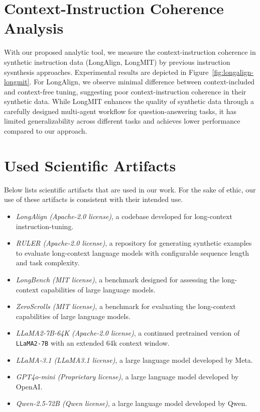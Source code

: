 \section{Context-Instruction Coherence Analysis}
\label{sec:longalign-longmit-context-free-tuning}
With our proposed analytic tool, we measure the context-instruction coherence in synthetic instruction data (LongAlign, LongMIT) by previous instruction sysnthesis approaches.
Experimental results are depicted in Figure~\ref{fig:longalign-longmit}.
For LongAlign, we observe minimal difference between context-included and context-free tuning, suggesting poor context-instruction coherence in their synthetic data.
While LongMIT enhances the quality of synthetic data through a carefully designed multi-agent workflow for question-answering tasks, it has limited generalizability across different tasks and achieves lower performance compared to our approach.

\section{Used Scientific Artifacts}
Below lists scientific artifacts that are used in our work. For the sake of ethic, our use of these artifacts is consistent with their intended use.
\begin{itemize} [itemsep=1pt]
    \item \textit{LongAlign (Apache-2.0 license)}, a codebase developed for long-context instruction-tuning. 
    \item \textit{RULER (Apache-2.0 license)}, a repository for generating synthetic examples to evaluate long-context language models with configurable sequence length and task complexity. 
    \item \textit{LongBench (MIT license)}, a benchmark designed for assessing the long-context capabilities of large language models.
    \item \textit{ZeroScrolls (MIT license)}, a benchmark for evaluating the long-context capabilities of large language models.
    \item \textit{LLaMA2-7B-64K (Apache-2.0 license)}, a continued pretrained version of \texttt{LLaMA2-7B} with an extended 64k context window.
    \item \textit{LLaMA-3.1 (LLaMA3.1 license)}, a large language model developed by Meta. 
    \item \textit{GPT4o-mini (Proprietary license)}, a large language model developed by OpenAI.
    \item \textit{Qwen-2.5-72B (Qwen license)}, a large language model developed by Qwen.
\end{itemize}